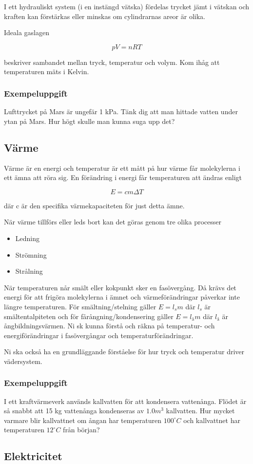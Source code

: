 \documentclass[10pt, titlepage, oneside, a4paper]{article}
\newcommand{\Subsection}[1]{\vspace{-4pt}\subsection{#1}\vspace{-8pt}}
\begin{document}
    I ett hydrauliskt system (i en instängd vätska) fördelas trycket jämt i vätskan och kraften kan förstärkas eller minskas
    om cylindrarnas areor är olika.

    Ideala gaslagen

    \begin{equation}
        pV = nRT
    \end{equation}

    beskriver sambandet mellan tryck, temperatur och volym. Kom ihåg att temperaturen mäts i Kelvin.
    \subsubsection{Exempeluppgift}
    Lufttrycket på Mars är ungefär 1 kPa. Tänk dig att man hittade vatten under ytan på Mars. Hur högt
    skulle man kunna suga upp det?
    \newpage
    \Subsection{Värme}
    Värme är en energi och temperatur är ett mått på hur värme får molekylerna i ett ämna att röra sig. En förändring i energi
    får temperaturen att ändras enligt

    \begin{equation}
        E = c m \Delta T
    \end{equation}

    där c är den specifika värmekapaciteten för just detta ämne.

    När värme tillförs eller leds bort kan det göras genom tre olika processer
    \begin{itemize}
        \item Ledning
        \item Strömning
        \item Strålning
    \end{itemize}
    När temperaturen når smält eller kokpunkt sker en fasövergång. Då krävs det energi för att frigöra molekylerna i ämnet
    och värmeförändringar påverkar inte längre temperaturen. För smältning/stelning gäller $E = l_s m$ där $l_s$ är
    smältentalpiteten och för fårångning/kondensering gäller $E = l_å m$ där $l_å$ är ångbildningsvärmen. Ni sk kunna förstå
    och räkna på temperatur- och energiförändringar i fasövergångar och temperaturförändringar.

    Ni ska också ha en grundläggande förståelse för hur tryck och temperatur driver vädersystem.
    \subsubsection{Exempeluppgift}
    I ett kraftvärmeverk används kallvatten för att kondensera vattenånga. Flödet är så snabbt att 15 kg vattenånga
    kondenseras av $1.0 m^3$ kallvatten. Hur mycket varmare blir kallvattnet om ångan har temperaturen $100 ^{\circ} C$ och
    kallvattnet har temperaturen $12 ^{\circ}C$ från början?
    \newpage
    \Subsection{Elektricitet}
\end{document}
